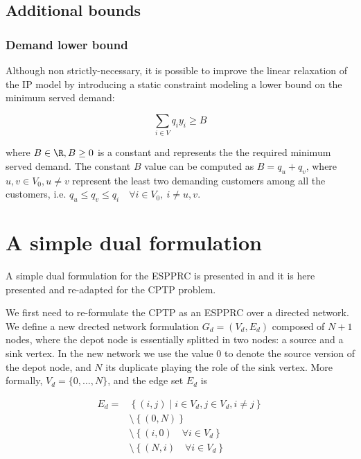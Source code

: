 \subsection{Additional bounds}

\subsubsection{Demand lower bound}\label{sec:demand-lower-bound}
Although non strictly-necessary, it is possible to improve the linear relaxation of the IP model by introducing a static constraint modeling a lower bound on the minimum served demand:

\begin{equation}\label{eq:resource-lower-bound-constraint}
	\sum_{i \in V} q_i y_i   \ge B
\end{equation}

where $B \in \R, B \ge 0$ is a constant and represents the the required minimum served demand.
The constant $B$ value can be computed as $B = q_u + q_v$, where $u, v \in V_0, u \ne v$ represent the least two demanding customers among all the customers, i.e. $q_u \le q_v \le q_i \quad \forall i \in V_0,\ i \ne u, v$.

\section{A simple dual formulation}\label{sec:cptp-simple-dual-formulation}

A simple dual formulation for the ESPPRC is presented in \cite{beasley1989algorithm} and it is here presented and re-adapted for the CPTP problem.

We first need to re-formulate the CPTP as an ESPPRC over a directed network.
We define a new drected network formulation $G_d = (V_d, E_d)$ composed of $N + 1$ nodes, where the depot node is essentially splitted in two nodes: a source and a sink vertex.
In the new network we use the value $0$ to denote the source version of the depot node, and $N$ its duplicate playing the role of the sink vertex.
More formally, $V_d = \{ 0, \dots, N  \}$, and the edge set $E_d$ is

\begin{equation}
	\begin{aligned}
		E_d = & \left\{ (i, j) \mid i \in V_d, j \in V_d, i \ne j \right\} \\
		      & \setminus \left\{ (0, N) \right\}                          \\
		      & \setminus \left\{ (i, 0) \quad \forall i \in V_d \right\}  \\
		      & \setminus \left\{ (N, i) \quad \forall i \in V_d \right\}  \\
	\end{aligned}
\end{equation}

